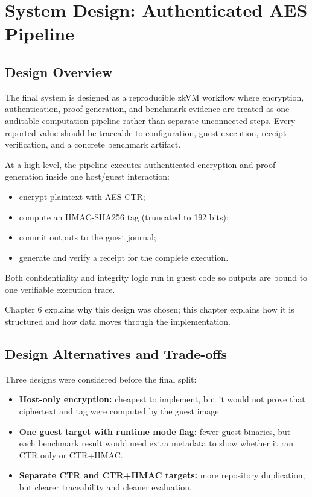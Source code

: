 \chapter{System Design: Authenticated AES Pipeline}

\section{Design Overview}

The final system is designed as a reproducible zkVM workflow where encryption,
authentication, proof generation, and benchmark evidence are treated as one
auditable computation pipeline rather than separate unconnected steps. Every
reported value should be traceable to configuration, guest execution, receipt
verification, and a concrete benchmark artifact.

At a high level, the pipeline executes authenticated encryption and proof
generation inside one host/guest interaction:

\begin{itemize}
\item encrypt plaintext with AES-CTR;
\item compute an HMAC-SHA256 tag (truncated to 192 bits);
\item commit outputs to the guest journal;
\item generate and verify a receipt for the complete execution.
\end{itemize}

Both confidentiality and integrity logic run in guest code so outputs are bound
to one verifiable execution trace.

Chapter 6 explains why this design was chosen; this chapter explains how it is
structured and how data moves through the implementation.

\section{Design Alternatives and Trade-offs}

Three designs were considered before the final split:

\begin{itemize}
\item \textbf{Host-only encryption:} cheapest to implement, but it would not prove
that ciphertext and tag were computed by the guest image.
\item \textbf{One guest target with runtime mode flag:} fewer guest binaries,
but each benchmark result would need extra metadata to show whether it ran CTR
only or CTR+HMAC.
\item \textbf{Separate CTR and CTR+HMAC targets:} more repository duplication, but
clearer traceability and cleaner evaluation.
\end{itemize}

